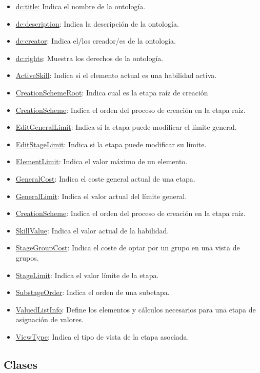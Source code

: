 \begin{itemize}
    
    \item \underline{dc:title}: Indica el nombre de la ontología.
    \item \underline{dc:description}: Indica la descripción de la ontología.
    \item \underline{dc:creator}: Indica el/los creador/es de la ontología.
    \item \underline{dc:rights}: Muestra los derechos de la ontología.
    \item \underline{ActiveSkill}: Indica si el elemento actual es una habilidad activa.
    \item \underline{CreationSchemeRoot}: Indica cual es la etapa raíz de creación
    \item \underline{CreationScheme}: Indica el orden del proceso de creación en la etapa raíz.
    \item \underline{EditGeneralLimit}: Indica si la etapa puede modificar el límite general.
    \item \underline{EditStageLimit}: Indica si la etapa puede modificar su límite.
    \item \underline{ElementLimit}: Indica el valor máximo de un elemento.
    \item \underline{GeneralCost}: Indica el coste general actual de una etapa.
    \item \underline{GeneralLimit}: Indica el valor actual del límite general.
    \item \underline{CreationScheme}: Indica el orden del proceso de creación en la etapa raíz.
    \item \underline{SkillValue}: Indica el valor actual de la habilidad.
    \item \underline{StageGroupCost}: Indica el coste de optar por un grupo en una vista de grupos.
    \item \underline{StageLimit}: Indica el valor límite de la etapa.
    \item \underline{SubstageOrder}: Indica el orden de una subetapa.
    \item \underline{ValuedListInfo}: Define los elementos y cálculos necesarios para una etapa de asignación de valores.
    \item \underline{ViewType}: Indica el tipo de vista de la etapa asociada.
\end{itemize}

\subsection{Clases}
